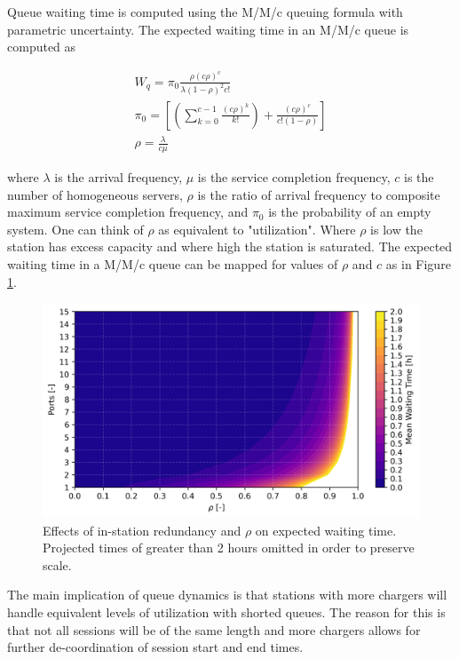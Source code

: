 Queue waiting time is computed using the M/M/c queuing formula with parametric uncertainty. The expected waiting time in an M/M/c queue is computed as

\begin{gather}
	W_q = \pi_0\frac{\rho(c\rho)^c}{\lambda(1-\rho)^2c!}\\
	\pi_0=\left[\left(\sum_{k = 0}^{c - 1}\frac{(c\rho)^k}{k!}\right) + \frac{(c\rho)^c}{c!(1 - \rho)}\right]\\
	\rho = \frac{\lambda}{c\mu}
\end{gather}

where $\lambda$ is the arrival frequency, $\mu$ is the service completion frequency, $c$ is the number of homogeneous servers, $\rho$ is the ratio of arrival frequency to composite maximum service completion frequency, and $\pi_0$ is the probability of an empty system. One can think of $\rho$ as equivalent to "utilization". Where $\rho$ is low the station has excess capacity and where high the station is saturated. The expected waiting time in a M/M/c queue can be mapped for values of $\rho$ and $c$ as in Figure \ref{fig:reduncancy_rho_wq}.

\begin{figure}[H]
	\centering
	\includegraphics[width = \linewidth]{figs/waiting_time_rho_ports.png}
	\caption{Effects of in-station redundancy and $\rho$ on expected waiting time. Projected times of greater than 2 hours omitted in order to preserve scale.}
	\label{fig:reduncancy_rho_wq}
\end{figure}

The main implication of queue dynamics is that stations with more chargers will handle equivalent levels of utilization with shorted queues. The reason for this is that not all sessions will be of the same length and more chargers allows for further de-coordination of session start and end times.

